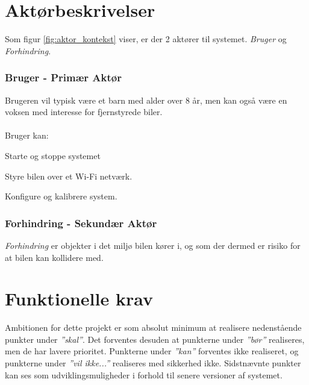 
\section{Aktørbeskrivelser} \label{sec:aktorbeskrivelser}
Som figur \ref{fig:aktor_kontekst} viser, er der 2 aktører til systemet.
\textit{Bruger} og \textit{Forhindring}.

\subsubsection{Bruger - Primær Aktør}
Brugeren vil typisk være et barn med alder over 8 år, men kan også være en voksen med interesse for fjernstyrede biler. \\ \\
Bruger kan:
\begin{packed_item}
	\item Starte og stoppe systemet 
	\item Styre bilen over et Wi-Fi netværk.
	\item Konfigure og kalibrere system.
\end{packed_item}

\subsubsection{Forhindring - Sekundær Aktør}
\textit{Forhindring} er objekter i det miljø bilen kører i, og som der dermed er risiko for at bilen kan kollidere med.  
\clearpage


\clearpage

\section{Funktionelle krav} \label{sec:funktionelle_krav}
Ambitionen for dette projekt er som absolut minimum at realisere nedenstående punkter under \textit{''skal''}. 
Det forventes desuden at punkterne under \textit{''bør''} realiseres, men de har lavere prioritet.
Punkterne under \textit{''kan''} forventes ikke realiseret, og punkterne under \textit{''vil ikke...''} realiseres med sikkerhed ikke. 
Sidstnævnte punkter kan ses som udviklingsmuligheder i forhold til senere versioner af systemet. 

